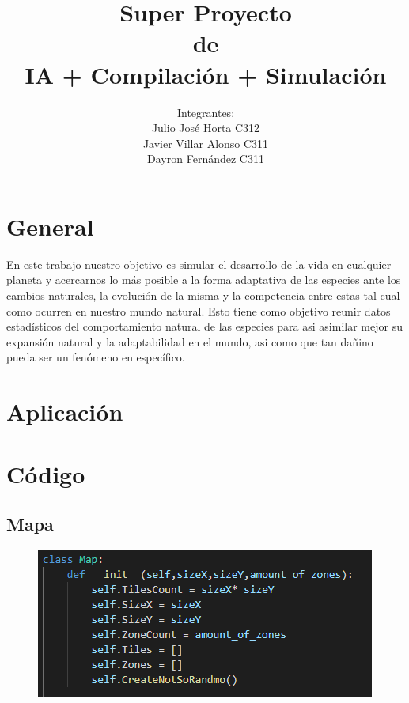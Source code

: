 \documentclass{llncs}
\title{\large\huge Super Proyecto\\de \\ IA + Compilación + Simulación}
\author{Integrantes: \\ Julio José Horta C312 \\Javier Villar Alonso C311 \\ Dayron Fernández C311}
\begin{document}
	
\maketitle

\newpage

\section{General}
En este trabajo nuestro objetivo es simular el desarrollo de la vida en cualquier planeta y acercarnos lo más posible a la forma adaptativa de las especies ante los cambios naturales, la evolución de la misma y la competencia entre estas tal cual como ocurren en nuestro mundo natural.
\newline
\newline
Esto tiene como objetivo reunir datos estadísticos del comportamiento natural de las especies para asi asimilar mejor su expansión natural y la adaptabilidad en el mundo, asi como que tan dañino pueda ser un fenómeno en específico. 


\section{Aplicación}

\section{Código}

\subsection{Mapa}
\begin{figure}[]
	\centering
	\includegraphics[width=0.7\linewidth]{imagenes/mapa}
	\label{fig:mapa}
\end{figure}
\end{document}
